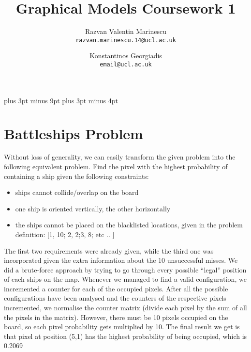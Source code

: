 \documentclass[11pt,a4paper,oneside]{report}
\title{Graphical Models Coursework 1}
\author{
    Razvan Valentin Marinescu\\
    \texttt{razvan.marinescu.14@ucl.ac.uk}
    \and
    Konstantinos Georgiadis\\
    \texttt{email@ucl.ac.uk}
}
\begin{document}
\belowdisplayskip=12pt plus 3pt minus 9pt
\belowdisplayshortskip=7pt plus 3pt minus 4pt

\maketitle{}



\section*{Battleships Problem}

Without loss of generality, we can easily transform the given problem into the following equivalent problem. Find the pixel with the highest probability of containing a ship given the following constraints: 
\begin{itemize}
 \item ships cannot collide/overlap on the board
 \item one ship is oriented vertically, the other horizontally
 \item the ships cannot be placed on the blacklisted locations, given in the problem definition: [1, 10; 2, 2;3, 8; etc .. ]
\end{itemize}

The first two requirements were already given, while the third one was incorporated given the extra information about the 10 unsuccessful misses. We did a brute-force approach by trying to go through every possible “legal” position of each ships on the map. Whenever we managed to find a valid configuration, we incremented a counter for each of the occupied pixels. After all the possible configurations have been analysed and the counters of the respective pixels incremented, we normalise the counter matrix (divide each pixel by the sum of all the pixels in the matrix). However, there must be 10 pixels occupied on the board, so each pixel probability gets multiplied by 10. The final result we get is that pixel at position (5,1) has the highest probability of being occupied, which is 0.2069
\end{document}
